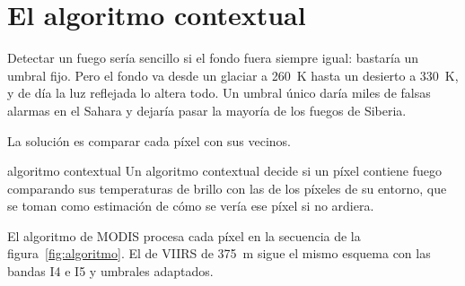 \section{El algoritmo contextual}

Detectar un fuego sería sencillo si el fondo fuera siempre igual: bastaría un umbral fijo. Pero
el fondo va desde un glaciar a 260~K hasta un desierto a 330~K, y de día la luz reflejada lo
altera todo. Un umbral único daría miles de falsas alarmas en el Sahara y dejaría pasar la
mayoría de los fuegos de Siberia.

La solución es comparar cada píxel con sus vecinos.

\begin{definicion}{algoritmo contextual}
Un algoritmo contextual decide si un píxel contiene fuego comparando sus temperaturas de brillo
con las de los píxeles de su entorno, que se toman como estimación de cómo se vería ese píxel
si no ardiera.
\end{definicion}

El algoritmo de MODIS procesa cada píxel en la secuencia de la figura~\ref{fig:algoritmo}. El de
VIIRS de 375~m sigue el mismo esquema con las bandas I4 e I5 y umbrales adaptados.

